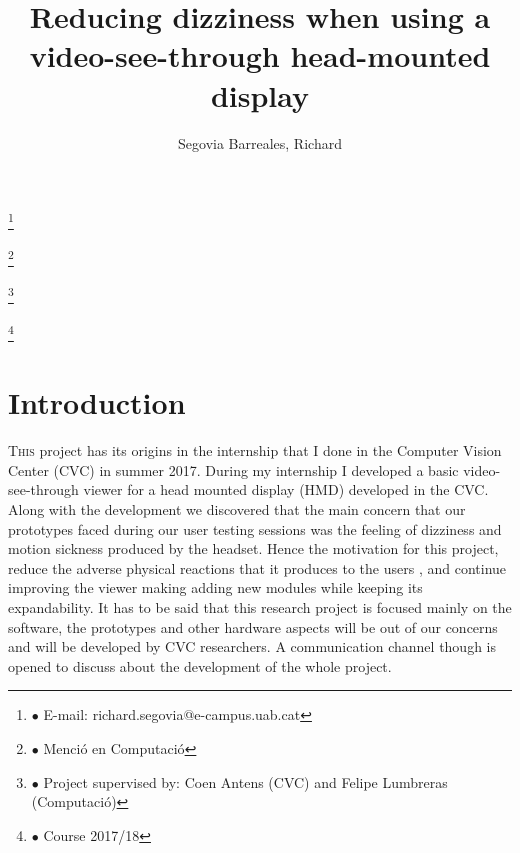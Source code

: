 \documentclass[10pt,a4paper,twocolumn,twoside]{article}
\author{\LARGE\sffamily Segovia Barreales, Richard}
\title{\Huge{\sffamily Reducing dizziness when using a video-see-through head-mounted display}}
\date{}
\newcommand\blfootnote[1]{%
	\begingroup
	\renewcommand\thefootnote{}\footnote{#1}%
	\addtocounter{footnote}{-1}%
	\endgroup
}
\begin{document}
	
	\fancyhead[RO]{\thepage}
	\fancyhead[LE]{\thepage}
	
	\fancyfoot[CO,CE]{}
	
	{
		\fancyhf{}
	}
	
	\renewcommand{\headrulewidth}{0pt}
	\renewcommand{\footrulewidth}{0pt}
	\pagestyle{fancy}
	
	\maketitle
	
	\thispagestyle{primerapagina}
	
	
	\blfootnote{$\bullet$ E-mail: richard.segovia@e-campus.uab.cat}
	\blfootnote{$\bullet$ Menció en Computació}
	\blfootnote{$\bullet$ Project supervised by: Coen Antens (CVC) and Felipe Lumbreras (Computació)}
	\blfootnote{$\bullet$ Course 2017/18}
	
	\section{Introduction}
	
	\lettrine[lines=3]{T}{his} project has its origins in the internship that I done in the Computer Vision Center (CVC) in summer 2017. During my internship I developed a basic video-see-through viewer for a head mounted display (HMD) developed in the CVC. Along with the development we discovered that the main concern that our prototypes faced during our user testing sessions was the feeling of dizziness and motion sickness produced by the headset. Hence the motivation for this project, reduce the adverse physical reactions that it produces to the users \cite{disconfortReview}, \cite{unpublishCVC} and continue improving the viewer making adding new modules while keeping its expandability. It has to be said that this research project is focused mainly on the software, the prototypes and other hardware aspects will be out of our concerns and will be developed by CVC researchers. A communication channel though is opened to discuss about the development of the whole project. 
	
\end{document}
